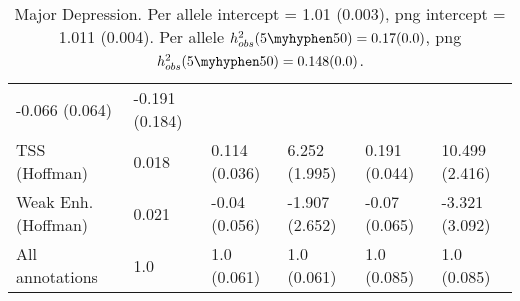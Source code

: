 \documentclass[11pt]{article}
\begin{document}
\begin{table}[H]
\begin{center}
\begin{tabular}{l|lllll}
-0.066 (0.064) & -0.191 (0.184) \\
TSS (Hoffman)  &  0.018 & 0.114 (0.036) & 6.252 (1.995) &
0.191 (0.044) & 10.499 (2.416) \\
Weak Enh. (Hoffman)  &  0.021 & -0.04 (0.056) & -1.907 (2.652) &
-0.07 (0.065) & -3.321 (3.092) \\
All annotations  &  1.0 & 1.0 (0.061) & 1.0 (0.061) &
1.0 (0.085) & 1.0 (0.085) \\
\end{tabular}
\caption{Major Depression.
Per allele intercept = 1.01 (0.003),
png intercept = 1.011 (0.004).
Per allele $h^2_{obs}(5\myhyphen50) = 0.17 (0.0)$,
png $h^2_{obs}(5\myhyphen50) = 0.148 (0.0)$.}
\end{center}
\end{table}
\end{document}
